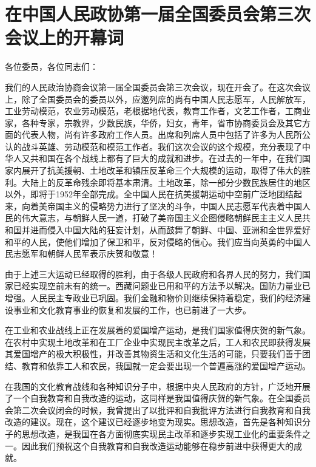 \section[在中国人民政协第一届全国委员会第三次会议上的开幕词（一九五一年十月二十三日）]{在中国人民政协第一届全国委员会第三次会议上的开幕词}


各位委员，各位同志们：

我们的人民政治协商会议第一届全国委员会第三次会议，现在开会了。在这次会议上，除了全国委员会的委员以外，应邀列席的尚有中国人民志愿军，人民解放军，工业劳动模范，农业劳动模范，老根据地代表，教育工作者，文艺工作者，工商业家，各种专家，宗教界，少数民族，华侨，妇女，青年，省市协商委员会及其它方面的代表人物，尚有许多政府工作人员。出席和列席人员中包括了许多为人民所公认的战斗英雄、劳动模范和模范工作者。我们这次会议的这个规模，充分表现了中华人又共和国在各个战线上都有了巨大的成就和进步。在过去的一年中，在我们国家内展开了抗美援朝、土地改革和镇压反革命三个大规模的运动，取得了伟大的胜利。大陆上的反革命残余即将基本肃清。土地改革，除一部分少数民族居住的地区以外，即将于1952年全部完成。全中国人民在抗美援朝运动中空前广泛地团结起来，向着美帝国主义的侵略势力进行了坚决的斗争，中国人民志愿军代表着中国人民的伟大意志，与朝鲜人民一道，打破了美帝国主义企图侵略朝鲜民主主义人民共和国并进而侵入中国大陆的狂妄计划，从而鼓舞了朝鲜、中国、亚洲和全世界爱好和平的人民，使他们增加了保卫和平，反对侵略的信心。我们应当向英勇的中国人民志愿军和朝鲜人民军表示庆贺和敬意！

由于上述三大运动已经取得的胜利，由于各级人民政府和各界人民的努力，我们国家已经实现空前未有的统一。西藏问题业已用和平的方法予以解决。国防力量业已增强。人民民主专政业已巩固。我们金融和物价则继续保持着稳定，我们的经济建设事业和文化教育事业的恢复和发展的工作，也已前进了一大步。

在工业和农业战线上正在发展着的爱国增产运动，是我们国家值得庆贺的新气象。在农村中实现土地改革和在工厂企业中实现民主改革之后，工人和农民即获得发展其爱国增产的极大积极性，并改善其物资生活和文化生活的可能，只要我们善于团结、教育和依靠工人和农民，我国就一定会要出现一个普遍高涨的爱国增产运动。

在我国的文化教育战线和各种知识分子中，根据中央人民政府的方针，广泛地开展了一个自我教育和自我改造的运动，这同样是我国值得庆贺的新气象。在全国委员会第二次会议闭会的时候，我曾提出了以批评和自我批评方法进行自我教育和自我改造的建议。现在，这个建议已经逐步地变为现实。思想改造，首先是各种知识分子的思想改造，是我国在各方面彻底实现民主改革和逐步实现工业化的重要条件之一。因此我们预祝这个自我教育和自我改造运动能够在稳步前进中获得更大的成就。

